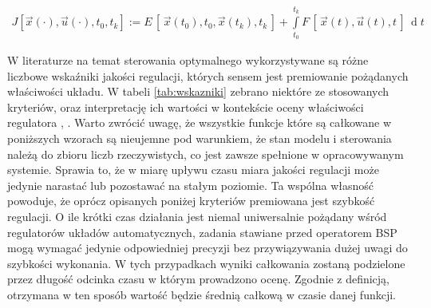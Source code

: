 \begin{align}
    \label{eq:pontryagin}
    J[\vec{x}(\cdot), \vec{u}(\cdot), t_0, t_k] :=E\,[\,\vec{x}(t_0),t_0,\vec{x}(t_k),t_k\,] + \int\limits_{t_0}^{t_k} F\,[\,\vec{x}(t),\vec{u}(t),t\,] \,\operatorname{d}t
\end{align}

W literaturze na temat sterowania optymalnego wykorzystywane są różne liczbowe wskaźniki jakości regulacji, których sensem jest premiowanie pożądanych właściwości układu. W tabeli \ref{tab:wskazniki} zebrano niektóre ze stosowanych kryteriów, oraz interpretację ich wartości w kontekście oceny właściwości regulatora \cite{tan2004}, \cite{kaczorek2015}. Warto zwrócić uwagę, że wszystkie funkcje które są całkowane w poniższych wzorach są nieujemne pod warunkiem, że stan modelu i sterowania należą do zbioru liczb rzeczywistych, co jest zawsze spełnione w opracowywanym systemie. Sprawia to, że w miarę upływu czasu miara jakości regulacji może jedynie narastać lub pozostawać na stałym poziomie. Ta wspólna własność powoduje, że oprócz opisanych poniżej kryteriów premiowana jest szybkość regulacji. O ile krótki czas działania jest niemal uniwersalnie pożądany wśród regulatorów układów automatycznych, zadania stawiane przed operatorem BSP mogą wymagać jedynie odpowiedniej precyzji bez przywiązywania dużej uwagi do szybkości wykonania. W tych przypadkach wyniki całkowania zostaną podzielone przez długość odcinka czasu w którym prowadzono ocenę. Zgodnie z definicją, otrzymana w ten sposób wartość będzie średnią całkową w czasie danej funkcji.

